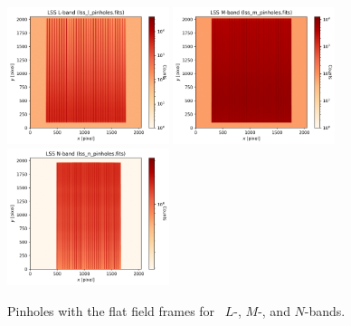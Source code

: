 \begin{figure}[!h]
\centering
  \includegraphics[height=4cm,keepaspectratio]{figures/LSS_CrtAlg_files/lss_l_pinholes.fits.png}
  \includegraphics[height=4cm,keepaspectratio]{figures/LSS_CrtAlg_files/lss_m_pinholes.fits.png}
  \includegraphics[height=4cm,keepaspectratio]{figures/LSS_CrtAlg_files/lss_n_pinholes.fits.png}
  \caption{Pinholes with the flat field frames for \lss~$L$-, $M$-, and $N$-bands.} 
  \label{fig:pinh}
\end{figure}

